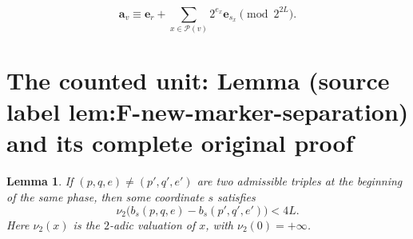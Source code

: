 \documentclass[10pt,a4paper]{amsart}
\theoremstyle{plain}
\newtheorem{lemma}[theorem]{Lemma}
\theoremstyle{definition}
\begin{document}
\begin{equation}
 \mathbf a_v
 \equiv
 \mathbf e_r+
 \sum_{x\in\mathcal P(v)}2^{e_x}\mathbf e_{s_x}
 \pmod {2^{2L}}.
 \label{eq:F-new-ancestry-expansion}
\end{equation}


\section{The counted unit: Lemma (source label lem:F-new-marker-separation) and its complete original proof}

\begin{lemma}
\label{lem:F-new-marker-separation}
If $(p,q,e)\neq(p',q',e')$ are two admissible triples at the beginning of the
same phase, then some coordinate $s$ satisfies
\begin{equation}
 \nu_2\bigl(b_s(p,q,e)-b_s(p',q',e')\bigr)<4L.
 \label{eq:F-new-triple-separation}
\end{equation}
Here $\nu_2(x)$ is the $2$-adic valuation of $x$, with
$\nu_2(0)=+\infty$.
\end{lemma}
\end{document}
